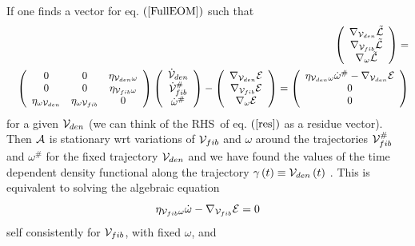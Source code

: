 If one finds a vector for eq. $\left( \ref{FullEOM}\right) $ such that 
\begin{eqnarray}
&&\left( 
\begin{array}{c}
\nabla _{{\cal V}_{den}}{\cal \tilde{L}} \\ 
\nabla _{{\cal V}_{fib}}{\cal \tilde{L}} \\ 
\nabla _{\omega }{\cal \tilde{L}}%
\end{array}%
\right) =  \nonumber \\
&&\left( 
\begin{array}{ccc}
0 & 0 & \eta _{{\cal V}_{den}\omega } \\ 
0 & 0 & \eta _{{\cal V}_{fib}\omega } \\ 
\eta _{\omega {\cal V}_{den}} & \eta _{\omega {\cal V}_{fib}} & 0%
\end{array}%
\right) \left( 
\begin{array}{c}
{\cal \dot{V}}_{den} \\ 
{\cal \dot{V}}_{fib}^{\#} \\ 
\dot{\omega}^{\#}%
\end{array}%
\right) -\left( 
\begin{array}{c}
\nabla _{{\cal V}_{den}}{\cal E} \\ 
\nabla _{{\cal V}_{fib}}{\cal E} \\ 
\nabla _{\omega }{\cal E}%
\end{array}%
\right) =\left( 
\begin{array}{c}
\eta _{{\cal V}_{den}\omega }\dot{\omega}^{\#}-\nabla _{{\cal V}_{den}}{\cal %
E} \\ 
0 \\ 
0%
\end{array}%
\right)  \label{res}
\end{eqnarray}%
for a given ${\cal V}_{den}$ (we can think of the RHS\ of eq. $\left( \ref%
{res}\right) $ as a residue vector). Then ${\cal A}$ is stationary wrt
variations of ${\cal V}_{fib}$ and $\omega $ around the trajectories ${\cal V%
}_{fib}^{\#}$ and $\omega ^{\#}$ for the fixed trajectory ${\cal V}_{den}$
and we have found the values of the time dependent density functional along
the trajectory $\gamma \left( t\right) \equiv {\cal V}_{den}\left( t\right) $%
. This is equivalent to solving the algebraic equation 
\begin{equation}
\eta _{{\cal V}_{fib}\omega }\dot{\omega}-\nabla _{{\cal V}_{fib}}{\cal E}=0
\label{vfibeq}
\end{equation}%
self consistently for ${\cal V}_{fib}$, with fixed $\omega $, and 
